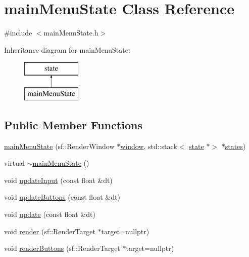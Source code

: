 \hypertarget{classmain_menu_state}{}\section{main\+Menu\+State Class Reference}
\label{classmain_menu_state}


{\ttfamily \#include $<$main\+Menu\+State.\+h$>$}

Inheritance diagram for main\+Menu\+State\+:\begin{figure}[H]
\begin{center}
\leavevmode
\includegraphics[height=2.000000cm]{classmain_menu_state}
\end{center}
\end{figure}
\subsection*{Public Member Functions}
\begin{DoxyCompactItemize}
\item 
\mbox{\hyperlink{classmain_menu_state_aea1bcc67a75fb1ee79695e7bce5fff3b}{main\+Menu\+State}} (sf\+::\+Render\+Window $\ast$\mbox{\hyperlink{classstate_a1bd5650a39b718f10a4efd5fb084e8b7}{window}}, std\+::stack$<$ \mbox{\hyperlink{classstate}{state}} $\ast$$>$ $\ast$\mbox{\hyperlink{classstate_af087bc20fa3153ddb682f8a223db682f}{states}})
\item 
virtual \mbox{\hyperlink{classmain_menu_state_adc83db1db1d6da9d35041d867d93916f}{$\sim$main\+Menu\+State}} ()
\item 
void \mbox{\hyperlink{classmain_menu_state_ab21e2978f82bf421c637cc74730aeca6}{update\+Input}} (const float \&dt)
\item 
void \mbox{\hyperlink{classmain_menu_state_aa3c901135c3f82e8fc20a587bb006ccc}{update\+Buttons}} (const float \&dt)
\item 
void \mbox{\hyperlink{classmain_menu_state_a24d60c6601ea578292ff8c957fca10dd}{update}} (const float \&dt)
\item 
void \mbox{\hyperlink{classmain_menu_state_ae8d65ed1c6552154715a49f24fae6b7f}{render}} (sf\+::\+Render\+Target $\ast$target=nullptr)
\item 
void \mbox{\hyperlink{classmain_menu_state_aa741f3c5e7aeb3c3c1c1bf8f99de76e3}{render\+Buttons}} (sf\+::\+Render\+Target $\ast$target=nullptr)
\end{DoxyCompactItemize}
